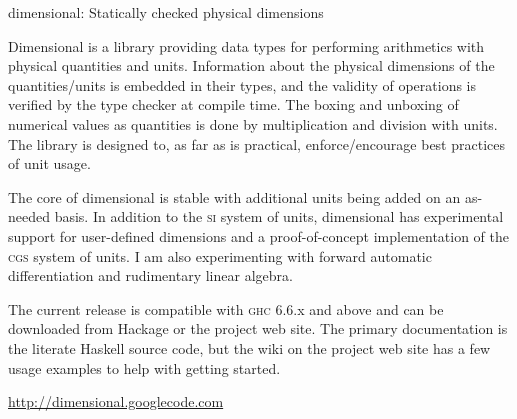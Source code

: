 \begin{hcarentry}{dimensional: Statically checked physical dimensions}
\label{dimensional}
\makeheader

Dimensional is a library providing data types for performing
arithmetics with physical quantities and units. Information about
the physical dimensions of the quantities/units is embedded in their
types, and the validity of operations is verified by the type checker
at compile time. The boxing and unboxing of numerical values as
quantities is done by multiplication and division with units. The
library is designed to, as far as is practical, enforce/encourage
best practices of unit usage.

The core of dimensional is stable with additional units being added
on an as-needed basis. In addition to the \textsc{si} system of
units, dimensional has experimental support for user-defined dimensions
and a proof-of-concept implementation of the \textsc{cgs} system
of units. I am also experimenting with forward automatic differentiation
and rudimentary linear algebra.

The current release is compatible with \textsc{ghc} 6.6.x and
above and can be downloaded from Hackage or the project web site.
The primary documentation is the literate Haskell source code, but
the wiki on the project web site has a few usage examples to help
with getting started.

\FurtherReading
 \url{http://dimensional.googlecode.com}
\end{hcarentry}
